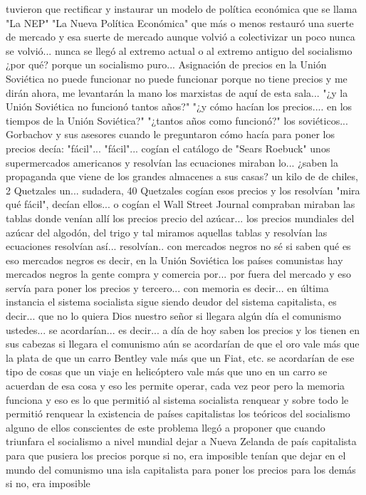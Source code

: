 tuvieron que rectificar y instaurar un modelo de política económica que se llama "La NEP" "La Nueva Política Económica"
que más o menos restauró una suerte de mercado y esa suerte de mercado aunque volvió a colectivizar un poco
nunca se volvió... nunca se llegó al extremo actual o al extremo antiguo del socialismo ¿por qué? porque un socialismo puro...
Asignación de precios en la Unión Soviética
no puede funcionar no puede funcionar porque no tiene precios y me dirán ahora, me levantarán la mano
los marxistas de aquí de esta sala... "¿y la Unión Soviética no funcionó tantos años?"
"¿y cómo hacían los precios.... en los tiempos de la Unión Soviética?" "¿tantos años como funcionó?" los soviéticos...
Gorbachov y sus asesores cuando le preguntaron cómo hacía para poner los precios
decía: "fácil"... "fácil"... cogían el catálogo de "Sears Roebuck" unos supermercados americanos
y resolvían las ecuaciones miraban lo... ¿saben la propaganda que viene de los grandes almacenes a sus casas?
un kilo de de chiles, 2 Quetzales un... sudadera, 40 Quetzales cogían esos precios y los resolvían
"mira qué fácil", decían ellos... o cogían el Wall Street Journal compraban miraban las tablas donde venían allí los precios
precio del azúcar... los precios mundiales del azúcar del algodón, del trigo y tal miramos aquellas tablas y resolvían las ecuaciones
resolvían así... resolvían.. con mercados negros no sé si saben qué es eso
mercados negros es decir, en la Unión Soviética los países comunistas hay mercados negros la gente compra y comercia por...
por fuera del mercado y eso servía para poner los precios y tercero...
con memoria es decir... en última instancia el sistema socialista sigue siendo deudor del sistema capitalista, es decir...
que no lo quiera Dios nuestro señor si llegara algún día el comunismo ustedes...
se acordarían... es decir... a día de hoy saben los precios y los tienen en sus cabezas
si llegara el comunismo aún se acordarían de que el oro vale más que la plata de que un carro Bentley vale más que un Fiat, etc.
se acordarían de ese tipo de cosas que un viaje en helicóptero vale más que uno en un carro se acuerdan de esa cosa y eso les permite operar, cada vez peor
pero la memoria funciona y eso es lo que permitió al sistema socialista renquear
y sobre todo le permitió renquear la existencia de países capitalistas los teóricos del socialismo alguno de ellos
conscientes de este problema llegó a proponer que cuando triunfara el socialismo a nivel mundial
dejar a Nueva Zelanda de país capitalista para que pusiera los precios porque si no, era imposible
tenían que dejar en el mundo del comunismo una isla capitalista para poner los precios para los demás si no, era imposible
